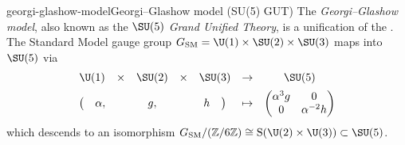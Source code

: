 \begin{topic}{georgi-glashow-model}{Georgi--Glashow model (SU(5) GUT)}
    The \emph{Georgi--Glashow model}, also known as the \emph{$\SU(5)$ Grand Unified Theory}, is a unification of the . The Standard Model gauge group $G_\textup{SM} = \U(1) \times \SU(2) \times \SU(3)$ maps into $\SU(5)$ via
    \[ \begin{array}{ccccccc}
        \U(1) & \times & \SU(2) & \times & \SU(3) & \to & \SU(5) \\[5pt]
        \big( \quad \alpha , & & g , & & h \quad \big) & \mapsto & \begin{pmatrix} \alpha^3 g & 0 \\ 0 & \alpha^{-2} h \end{pmatrix}
    \end{array} \]
    which descends to an isomorphism $G_\textup{SM} / (\ZZ/6\ZZ) \cong \textup{S}(\U(2) \times \U(3)) \subset \SU(5)$.


\end{topic}
